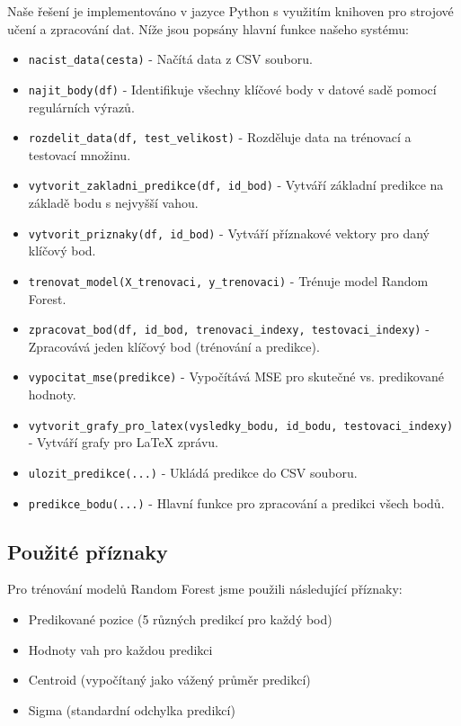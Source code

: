 \documentclass[a4paper,12pt]{article}
\begin{document}
Naše řešení je implementováno v jazyce Python s využitím knihoven pro strojové učení a zpracování dat. Níže jsou popsány hlavní funkce našeho systému:

\begin{itemize}
    \item \texttt{nacist\_data(cesta)} - Načítá data z CSV souboru.
    \item \texttt{najit\_body(df)} - Identifikuje všechny klíčové body v datové sadě pomocí regulárních výrazů.
    \item \texttt{rozdelit\_data(df, test\_velikost)} - Rozděluje data na trénovací a testovací množinu.
    \item \texttt{vytvorit\_zakladni\_predikce(df, id\_bod)} - Vytváří základní predikce na základě bodu s nejvyšší vahou.
    \item \texttt{vytvorit\_priznaky(df, id\_bod)} - Vytváří příznakové vektory pro daný klíčový bod.
    \item \texttt{trenovat\_model(X\_trenovaci, y\_trenovaci)} - Trénuje model Random Forest.
    \item \texttt{zpracovat\_bod(df, id\_bod, trenovaci\_indexy, testovaci\_indexy)} - Zpracovává jeden klíčový bod (trénování a predikce).
    \item \texttt{vypocitat\_mse(predikce)} - Vypočítává MSE pro skutečné vs. predikované hodnoty.
    \item \texttt{vytvorit\_grafy\_pro\_latex(vysledky\_bodu, id\_bodu, testovaci\_indexy)} - Vytváří grafy pro LaTeX zprávu.
    \item \texttt{ulozit\_predikce(...)} - Ukládá predikce do CSV souboru.
    \item \texttt{predikce\_bodu(...)} - Hlavní funkce pro zpracování a predikci všech bodů.
\end{itemize}

\subsection{Použité příznaky}

Pro trénování modelů Random Forest jsme použili následující příznaky:

\begin{itemize}
    \item Predikované pozice (5 různých predikcí pro každý bod)
    \item Hodnoty vah pro každou predikci
    \item Centroid (vypočítaný jako vážený průměr predikcí)
    \item Sigma (standardní odchylka predikcí)
\end{itemize}
\end{document}

